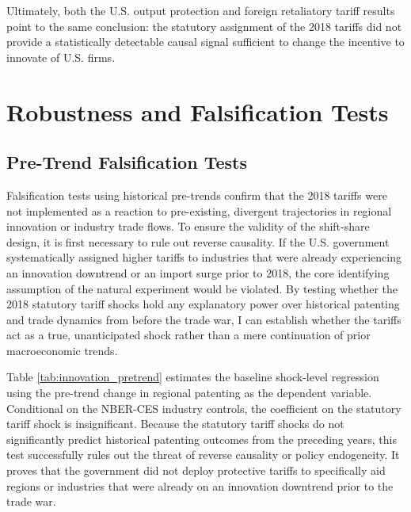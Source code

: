 \documentclass[12pt]{article}
\numberwithin{figure}{section}
\numberwithin{table}{section}
\begin{document}
Ultimately, both the U.S. output protection and foreign retaliatory tariff results point to the same conclusion: the statutory assignment of the 2018 tariffs did not provide a statistically detectable causal signal sufficient to change the incentive to innovate of U.S. firms.






\newpage
\section{Robustness and Falsification Tests}
\subsection{Pre-Trend Falsification Tests}

Falsification tests using historical pre-trends confirm that the 2018 tariffs were not implemented as a reaction to pre-existing, divergent trajectories in regional innovation or industry trade flows. To ensure the validity of the shift-share design, it is first necessary to rule out reverse causality. If the U.S. government systematically assigned higher tariffs to industries that were already experiencing an innovation downtrend or an import surge prior to 2018, the core identifying assumption of the natural experiment would be violated. By testing whether the 2018 statutory tariff shocks hold any explanatory power over historical patenting and trade dynamics from before the trade war, I can establish whether the tariffs act as a true, unanticipated shock rather than a mere continuation of prior macroeconomic trends.

Table \ref{tab:innovation_pretrend} estimates the baseline shock-level regression using the pre-trend change in regional patenting as the dependent variable. Conditional on the NBER-CES industry controls, the coefficient on the statutory tariff shock is insignificant. Because the statutory tariff shocks do not significantly predict historical patenting outcomes from the preceding years, this test successfully rules out the threat of reverse causality or policy endogeneity. It proves that the government did not deploy protective tariffs to specifically aid regions or industries that were already on an innovation downtrend prior to the trade war.
\end{document}
